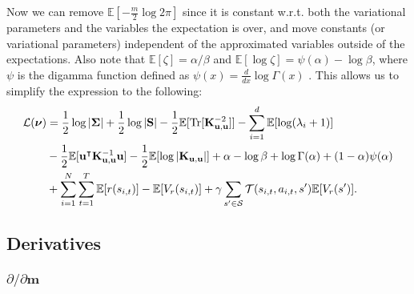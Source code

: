 \documentclass{mprop}
\theoremstyle{definition}
\DeclareMathOperator{\Tr}{Tr}
\begin{document}
Now we can remove $\mathbb{E}\left[-\frac{m}{2}\log2\pi\right]$ since it is
constant w.r.t. both the variational parameters and the variables the
expectation is over, and move constants (or variational parameters) independent
of the approximated variables outside of the expectations. Also note that
$\mathbb{E}[\zeta] = \alpha/\beta$ and
$\mathbb{E}[\log \zeta] = \psi(\alpha) - \log \beta$, where $\psi$ is the
digamma function defined as $\psi(x) = \frac{d}{dx}\log\Gamma(x)$
\cite{DBLP:books/lib/Bishop07}. This allows us to
simplify the expression to the following:
\begin{align*}
  \mathcal{L}(\bm\nu) &= \frac{1}{2}\log|\bm\Sigma| + \frac{1}{2}\log|\mathbf{S}| - \frac{1}{2} \mathbb{E}[\Tr[\Kuu^{-2}]] -
    \sum_{i=1}^d \mathbb{E}[\log(\lambda_i + 1)] \\
  &- \frac{1}{2}\mathbb{E}[\mathbf{u}^\intercal\Kuu^{-1}\mathbf{u}] - \frac{1}{2}\mathbb{E}[\log|\Kuu|] + \alpha - \log\beta + \log\Gamma(\alpha) + (1 - \alpha)\psi(\alpha) \\
  &+ \sum_{i=1}^N \sum_{t=1}^T \mathbb{E}[r(s_{i,t})] - \mathbb{E}[V_r(s_{i,t})] + \gamma\sum_{s' \in \mathcal{S}} \mathcal{T}(s_{i,t}, a_{i,t}, s')\mathbb{E}[V_r(s')]. \\
\end{align*}

\subsection{Derivatives}

\subsubsection{$\partial/\partial\mathbf{m}$}
\end{document}
